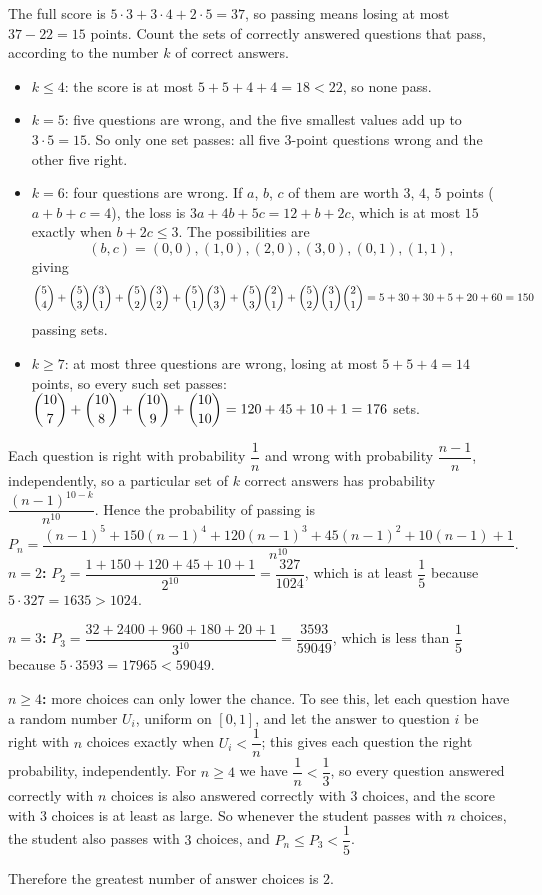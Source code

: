 The full score is $5\cdot3+3\cdot4+2\cdot5=37$, so passing means losing at most $37-22=15$ points. Count the sets of correctly answered questions that pass, according to the number $k$ of correct answers.
\begin{itemize}
\item $k\le4$: the score is at most $5+5+4+4=18<22$, so none pass.
\item $k=5$: five questions are wrong, and the five smallest values add up to $3\cdot5=15$. So only one set passes: all five $3$-point questions wrong and the other five right.
\item $k=6$: four questions are wrong. If $a$, $b$, $c$ of them are worth $3$, $4$, $5$ points ($a+b+c=4$), the loss is $3a+4b+5c=12+b+2c$, which is at most $15$ exactly when $b+2c\le3$. The possibilities are
\[(b,c)=(0,0),(1,0),(2,0),(3,0),(0,1),(1,1),\]
giving
\[\dbinom54+\dbinom53\dbinom31+\dbinom52\dbinom32+\dbinom51\dbinom33+\dbinom53\dbinom21+\dbinom52\dbinom31\dbinom21=5+30+30+5+20+60=150\]
passing sets.
\item $k\ge7$: at most three questions are wrong, losing at most $5+5+4=14$ points, so every such set passes: $\dbinom{10}7+\dbinom{10}8+\dbinom{10}9+\dbinom{10}{10}=120+45+10+1=176$ sets.
\end{itemize}
Each question is right with probability $\dfrac1n$ and wrong with probability $\dfrac{n-1}{n}$, independently, so a particular set of $k$ correct answers has probability $\dfrac{(n-1)^{10-k}}{n^{10}}$. Hence the probability of passing is
\[P_n=\dfrac{(n-1)^5+150(n-1)^4+120(n-1)^3+45(n-1)^2+10(n-1)+1}{n^{10}}.\]
\textbf{$n=2$:} $P_2=\dfrac{1+150+120+45+10+1}{2^{10}}=\dfrac{327}{1024}$, which is at least $\dfrac15$ because $5\cdot327=1635>1024$.

\textbf{$n=3$:} $P_3=\dfrac{32+2400+960+180+20+1}{3^{10}}=\dfrac{3593}{59049}$, which is less than $\dfrac15$ because $5\cdot3593=17965<59049$.

\textbf{$n\ge4$:} more choices can only lower the chance. To see this, let each question have a random number $U_i$, uniform on $[0,1]$, and let the answer to question $i$ be right with $n$ choices exactly when $U_i<\dfrac1n$; this gives each question the right probability, independently. For $n\ge4$ we have $\dfrac1n<\dfrac13$, so every question answered correctly with $n$ choices is also answered correctly with $3$ choices, and the score with $3$ choices is at least as large. So whenever the student passes with $n$ choices, the student also passes with $3$ choices, and $P_n\le P_3<\dfrac15$.

Therefore the greatest number of answer choices is $\boxed{2}$.
